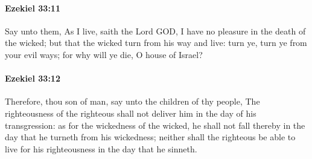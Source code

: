 		\paragraph{Ezekiel 33:11} %
			\label{EZEKIEL-33-11}

			Say unto them, As I live, saith the Lord GOD, I have no pleasure in the death of the wicked; but that the wicked turn from his way and live: turn ye, turn ye from your evil ways; for why will ye die, O house of Israel?


		\paragraph{Ezekiel 33:12} %
			\label{EZEKIEL-33-12}

			Therefore, thou son of man, say unto the children of thy people, The righteousness of the righteous shall not deliver him in the day of his transgression: as for the wickedness of the wicked, he shall not fall thereby in the day that he turneth from his wickedness; neither shall the righteous be able to live for his righteousness in the day that he sinneth.

